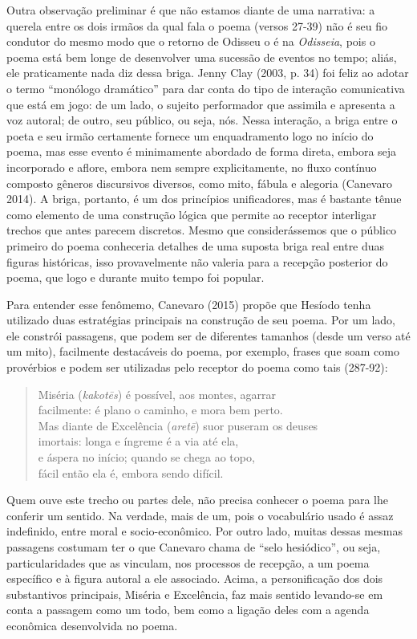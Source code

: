 Outra observação preliminar é que não estamos diante de uma narrativa: a
querela entre os dois irmãos da qual fala o poema (versos 27-39) não é
seu fio condutor do mesmo modo que o retorno de Odisseu o é na
\emph{Odisseia}, pois o poema está bem longe de desenvolver uma sucessão
de eventos no tempo; aliás, ele praticamente nada diz dessa briga. Jenny
Clay (2003, p. 34) foi feliz ao adotar o termo ``monólogo dramático''
para dar conta do tipo de interação comunicativa que está em jogo: de um
lado, o sujeito performador que assimila e apresenta a voz autoral; de
outro, seu público, ou seja, nós. Nessa interação, a briga entre o poeta
e seu irmão certamente fornece um enquadramento logo no início do poema,
mas esse evento é minimamente abordado de forma direta, embora seja
incorporado e aflore, embora nem sempre explicitamente, no fluxo
contínuo composto gêneros discursivos diversos, como mito, fábula e
alegoria (Canevaro 2014). A briga, portanto, é um dos princípios
unificadores, mas é bastante tênue como elemento de uma construção
lógica que permite ao receptor interligar trechos que antes parecem
discretos. Mesmo que considerássemos que o público primeiro do poema
conheceria detalhes de uma suposta briga real entre duas figuras
históricas, isso provavelmente não valeria para a recepção posterior do
poema, que logo e durante muito tempo foi popular.

Para entender esse fenômemo, Canevaro (2015) propõe que Hesíodo tenha
utilizado duas estratégias principais na construção de seu poema. Por um
lado, ele constrói passagens, que podem ser de diferentes tamanhos
(desde um verso até um mito), facilmente destacáveis do poema, por
exemplo, frases que soam como provérbios e podem ser utilizadas pelo
receptor do poema como tais (287-92):

\begin{verse}
Miséria (\emph{kakotēs}) é possível, aos montes, agarrar\\
facilmente: é plano o caminho, e mora bem perto.\\
Mas diante de Excelência (\emph{aretē}) suor puseram os deuses\\
imortais: longa e íngreme é a via até ela,\\
e áspera no início; quando se chega ao topo,\\
fácil então ela é, embora sendo difícil.
\end{verse}

Quem ouve este trecho ou partes dele, não precisa conhecer o poema para
lhe conferir um sentido. Na verdade, mais de um, pois o vocabulário
usado é assaz indefinido, entre moral e socio-econômico. Por outro lado,
muitas dessas mesmas passagens costumam ter o que Canevaro chama de
``selo hesiódico'', ou seja, particularidades que as vinculam, nos
processos de recepção, a um poema específico e à figura autoral a ele
associado. Acima, a personificação dos dois substantivos principais,
Miséria e Excelência, faz mais sentido levando-se em conta a passagem
como um todo, bem como a ligação deles com a agenda econômica
desenvolvida no poema.

